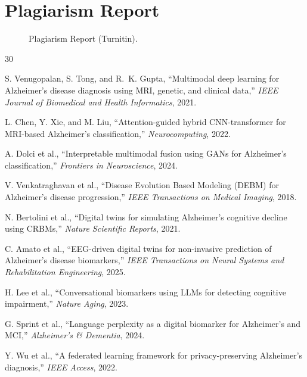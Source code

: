 \documentclass[12pt,singleside,a4paper]{article}
\begin{document}
\section{Plagiarism Report}

\begin{figure}[h]
\centering
\caption{Plagiarism Report (Turnitin).}
\end{figure}

\pagebreak
\begin{thebibliography}{30}

S. Venugopalan, S. Tong, and R.~K. Gupta, ``Multimodal deep learning for Alzheimer's disease diagnosis using MRI, genetic, and clinical data,'' \textit{IEEE Journal of Biomedical and Health Informatics}, 2021.

L. Chen, Y. Xie, and M. Liu, ``Attention-guided hybrid CNN-transformer for MRI-based Alzheimer's classification,'' \textit{Neurocomputing}, 2022.

A. Dolci et al., ``Interpretable multimodal fusion using GANs for Alzheimer's classification,'' \textit{Frontiers in Neuroscience}, 2024.

V. Venkatraghavan et al., ``Disease Evolution Based Modeling (DEBM) for Alzheimer's disease progression,'' \textit{IEEE Transactions on Medical Imaging}, 2018.

N. Bertolini et al., ``Digital twins for simulating Alzheimer's cognitive decline using CRBMs,'' \textit{Nature Scientific Reports}, 2021.

C. Amato et al., ``EEG-driven digital twins for non-invasive prediction of Alzheimer's disease biomarkers,'' \textit{IEEE Transactions on Neural Systems and Rehabilitation Engineering}, 2025.

H. Lee et al., ``Conversational biomarkers using LLMs for detecting cognitive impairment,'' \textit{Nature Aging}, 2023.

G. Sprint et al., ``Language perplexity as a digital biomarker for Alzheimer's and MCI,'' \textit{Alzheimer's \& Dementia}, 2024.

Y. Wu et al., ``A federated learning framework for privacy-preserving Alzheimer's diagnosis,'' \textit{IEEE Access}, 2022.


\end{thebibliography}
\end{document}

